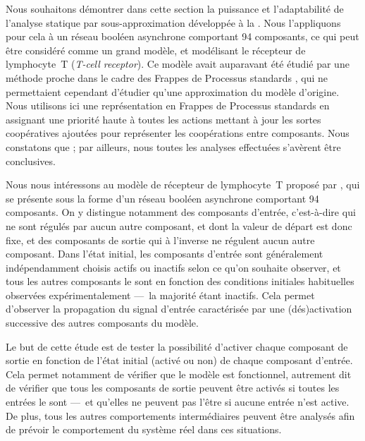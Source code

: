 Nous souhaitons démontrer dans cette section la puissance et l'adaptabilité
de l'analyse statique par sous-approximation développée à la .
Nous l'appliquons pour cela à un réseau booléen asynchrone
comportant 94 composants, ce qui peut être considéré comme un grand modèle,
et modélisant le récepteur de lymphocyte~T (\textit{T-cell receptor}).
Ce modèle avait auparavant été étudié par une méthode proche dans le cadre
des Frappes de Processus standards \cite{PMR12-MSCS},
qui ne permettaient cependant d'étudier qu'une approximation du modèle d'origine.
Nous utilisons ici une représentation en Frappes de Processus standards
en assignant une priorité haute à toutes les actions mettant à jour les sortes coopératives
ajoutées pour représenter les coopérations entre composants.
Nous constatons que
 ;
par ailleurs, nous toutes les analyses effectuées s'avèrent être conclusives.

\myskip

Nous nous intéressons au modèle de récepteur de lymphocyte~T
proposé par ,
qui se présente sous la forme d'un réseau booléen asynchrone comportant 94 composants.
On y distingue notamment des composants d'entrée, c'est-à-dire qui ne sont régulés
par aucun autre composant, et dont la valeur de départ est donc fixe,
et des composants de sortie qui à l'inverse ne régulent aucun autre composant.
Dans l'état initial, les composants d'entrée sont généralement
indépendamment choisis actifs ou inactifs selon ce qu'on souhaite observer,
et tous les autres composants le sont en fonction des conditions initiales habituelles
observées expérimentalement ---~la majorité étant inactifs.
Cela permet d'observer la propagation du signal d'entrée caractérisée par une (dés)activation
successive des autres composants du modèle.

Le but de cette étude est de tester la possibilité d'activer chaque composant de sortie
en fonction de l'état initial (activé ou non) de chaque composant d'entrée.
Cela permet notamment de vérifier que le modèle est fonctionnel,
autrement dit de vérifier que
tous les composants de sortie peuvent être activés si toutes les entrées le sont
---~et qu'elles ne peuvent pas l'être si aucune entrée n'est active.
De plus, tous les autres comportements intermédiaires peuvent être analysés
afin de prévoir le comportement du système réel dans ces situations.

